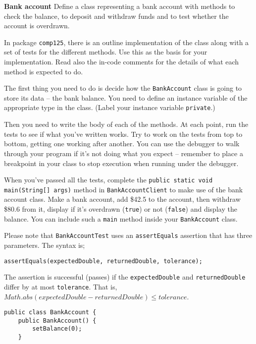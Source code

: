 \begin{questions}

\question  \textbf{Bank account} \vskip 0.5cm
Define a class representing a bank account with methods to check the balance, to deposit and withdraw funds and to test whether the account is overdrawn.

In package \texttt{comp125}, there is an outline implementation of the class along with a set of tests for the different methods. Use this as the basis for your implementation. Read also the in-code comments for the details of what each method is expected to do.

The first thing you need to do is decide how the \texttt{BankAccount} class is going to store its data -- the bank balance. You need to define an instance variable of the appropriate type in the class. (Label your instance variable \texttt{private}.)

Then you need to write the body of each of the methods. At each point, run the tests to see if what you've written works. Try to work on the tests from top to bottom, getting one working after another. You can use the debugger to walk through your program if it's not doing what you expect -- remember to place a breakpoint in your class to stop execution when running under the debugger.

When you've passed all the tests, complete the \texttt{public static void main(String[] args)} method in \newline \texttt{BankAccountClient} to make use of the bank account class. Make a bank account, add \$42.5 to the account, then withdraw \$80.6 from it, display if it's overdrawn (\texttt{true}) or not (\texttt{false}) and display the balance. You can include such a \texttt{main} method inside your \texttt{BankAccount} class.

Please note that \texttt{BankAccountTest} uses an \texttt{assertEquals} assertion that has three parameters. The syntax is;

\begin{lstlisting}
assertEquals(expectedDouble, returnedDouble, tolerance);
\end{lstlisting}

The assertion is successful (passes) if the \texttt{expectedDouble} and \texttt{returnedDouble} differ by at most \texttt{tolerance}. That is, $Math.abs(expectedDouble - returnedDouble) \le tolerance$.

\begin{solution}
\begin{lstlisting}
public class BankAccount {
	public BankAccount() {
		setBalance(0);
	}
	

\end{lstlisting}
\end{solution}
\end{questions}
